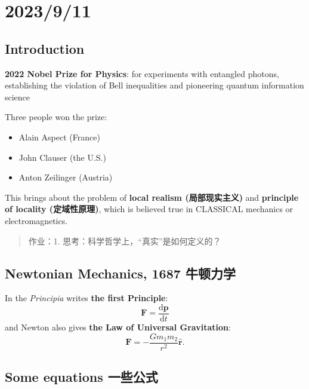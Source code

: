 \chapter{2023/9/11}\label{20230911}

\section{Introduction}\label{introduction}

\textbf{2022 Nobel Prize for Physics}: for experiments with entangled photons, establishing the violation of Bell inequalities and pioneering quantum information science

Three people won the prize: \begin{itemize}
\tightlist{}
    \item
    Alain Aspect (France)
    \item
    John Clauser (the U.S.)
    \item
    Anton Zeilinger (Austria)
\end{itemize}

This brings about the problem of \textbf{local realism (局部现实主义)} and \textbf{principle of locality (定域性原理)}, which is believed true in CLASSICAL mechanics or electromagnetics.

\begin{quote}
作业：1. 思考：科学哲学上，``真实''是如何定义的？
\end{quote}

\section{Newtonian Mechanics, 1687 牛顿力学}\label{newtonian-mechanics-1687-ux725bux987fux529bux5b66}

In the \emph{Principia} writes \textbf{the first Principle}: \[\boldsymbol F=\frac{\mathrm d \boldsymbol p} {\mathrm dt}\] and Newton also gives \textbf{the Law of Universal Gravitation}: \[ \boldsymbol F = -\frac{Gm_1m_2}{r^2} \hat {\boldsymbol r}.\]

\section{Some equations 一些公式}\label{some-equations-ux4e00ux4e9bux516cux5f0f}

